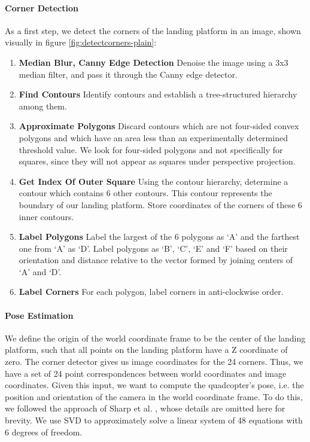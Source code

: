 \documentclass{acm_proc_article-sp}
\begin{document}
\paragraph{Corner Detection}

As a first step, we detect the corners of the landing platform in an image, shown visually in figure \ref{fig:detectcorners-plain}:
\begin{enumerate}
\setlength{\itemsep}{0pt}
\setlength{\parskip}{0pt}
\setlength{\parsep}{0pt}
\item{
    \textbf{Median Blur, Canny Edge Detection} Denoise the image using a 3x3 median filter, and pass it through the Canny
    edge detector.}
\item{
    \textbf{Find Contours} Identify contours and establish a tree-structured hierarchy among them.}
\item{
    \textbf{Approximate Polygons} Discard contours which are not four-sided convex polygons and which have an
    area less than an experimentally determined threshold value.  We look for
    four-sided polygons and not specifically for squares, since they will not
    appear as squares under perspective projection.}
\item{
    \textbf{Get Index Of Outer Square} Using the contour hierarchy, determine a contour which contains 6 other
    contours. This contour represents the boundary of our landing platform.
    Store coordinates of the corners of these 6 inner contours.}
\item{
    \textbf{Label Polygons}  Label the largest of the 6 polygons as `A' and the farthest one from `A' as
    `D'. Label polygons as `B', `C', `E' and `F' based on their orientation and
    distance relative to the vector formed by joining centers of `A' and `D'.}
\item{
    \textbf{Label Corners} For each polygon, label corners in anti-clockwise order.}
\end{enumerate}

\paragraph{Pose Estimation}

We define the origin of the world coordinate frame to be the center of the
landing platform, such that all points on the landing platform have a Z
coordinate of zero. The corner detector gives us image coordinates for the 24
corners. Thus, we have a set of 24 point correspondences between world
coordinates and image coordinates. Given this input, we want to compute the
quadcopter's pose, i.e. the position and orientation of the camera in the world
coordinate frame. To do this, we followed the approach of Sharp et al.
 \cite{sharp_et_al_2001}, whose details are omitted here for brevity. We use SVD to
approximately solve a linear system of 48 equations with 6 degrees of freedom.
\end{document}
